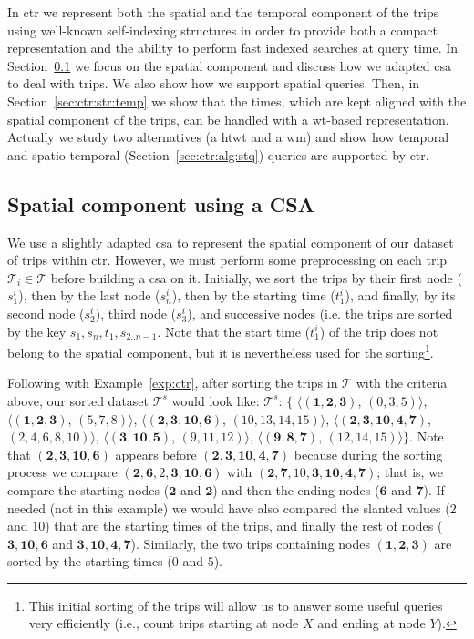 	In \gls{ctr} we represent both the spatial and the temporal component of the trips using well-known
	self-indexing structures in order to provide both a compact representation and the ability to 
	perform fast indexed searches at query time. In Section~\ref{sec:ctr:str:spat} we focus on the
	spatial component and discuss how we adapted  \gls{csa} to deal with trips. We also
	show how we support spatial queries. Then, in Section~\ref{sec:ctr:str:temp} we show that the times,
	which are kept aligned with the spatial component of the trips, can be handled with   
	a \gls{wt}-based representation. Actually we study two alternatives (a \gls{htwt} and a \gls{wm}) 
	and show how temporal and spatio-temporal (Section~\ref{sec:ctr:alg:stq}) queries are supported by \gls{ctr}.

	\subsection{Spatial component using a CSA}
	\label{sec:ctr:str:spat}
	We use a slightly adapted \gls{csa} to represent the spatial component of our dataset of trips within \gls{ctr}. 
	However, we must perform some preprocessing on each trip  $\mathcal{T}_i \in \mathcal{T}$ before building a \gls{csa} on it. Initially, we sort the trips by their first node ($s^i_1$), then by the last node ($s^i_n$), then by the starting time ($t^i_1$), and finally, by its second node ($s^i_2$), third node ($s^i_3$), and successive nodes (i.e. the trips are sorted by the key $s_1,s_n,t_1,s_{2..n-1}$.  Note that the start time ($t^i_1$) of the trip does not belong to the spatial component, but it is nevertheless used for the sorting\footnote{This initial sorting of the trips will allow us to answer some useful queries very efficiently  (i.e., count trips starting at node $X$ and ending at node $Y$).}.

	Following with Example~\ref{exp:ctr}, after sorting the trips in $\mathcal{T}$ with the criteria above, 
	our sorted dataset $\mathcal{T}^s$ would look like: 
	$\mathcal{T}^s$: $\{$%
	$\langle (\mathbf{1,2,3     })$, $(\mathit{0,3,5})                     \rangle$, 
	$\langle (\mathbf{1,2,3     })$, $(\mathit{5,7,8})                     \rangle$, 
	$\langle (\mathbf{2,3,10,6  })$, $(\mathit{10,13,14,15})           \rangle$, 
	$\langle (\mathbf{2,3,10,4,7})$, $(\mathit{2,4,6,8,10}) \rangle$, 
	$\langle (\mathbf{3,10,5    })$, $(\mathit{9,11,12})                     \rangle$, 
	$\langle (\mathbf{9,8,7     })$, $(\mathit{12,14,15})                    \rangle$$\}$. 
	Note that  $ (\mathbf{2,3,10,6  })$ appears before $(\mathbf{2,3,10,4,7})$ because
	during the sorting process we compare $ (\mathbf{2,6,\mathit{2},3, 10,6  })$ with $ (\mathbf{2,7,\mathit{10},3, 10,4,7})$;
	that is, we compare the starting nodes ($\mathbf{2}$ and $\mathbf{2}$) and then the ending nodes ($\mathbf{6}$ and $\mathbf{7}$).
	If needed  (not in this example) we would have also compared the slanted values ($\mathit{2}$ and $\mathit{10}$) 
	that are the starting times of the trips, and finally the rest of nodes  ($ \mathbf{3, 10,6  }$ and $ \mathbf{3, 10,4,7}$).
	Similarly, the two trips containing nodes $ (\mathbf{1,2,3})$ are sorted by the starting times ($\mathit{0}$ and $\mathit{5}$).



